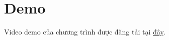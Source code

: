 \documentclass[a4paper]{article}
\author{Tạ Chí Thành Danh}
\begin{document}


\tableofcontents
\listoffigures
\listoftables
\newpage


\newpage


\section{Demo}
Video demo của chương trình được đăng tải tại \href{https://youtu.be/dQw4w9WgXcQ?si=F-Y1r2bzGl6giY5L}{đây}.
\newpage

\end{document}
